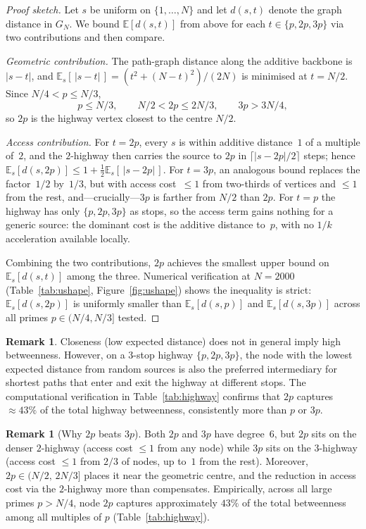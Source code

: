 \documentclass[11pt]{article}
\theoremstyle{plain}
\theoremstyle{definition}
\newtheorem{remark}[theorem]{Remark}
\newcommand{\EE}{\mathbb{E}}
\begin{document}
\begin{proof}[Proof sketch]
Let $s$ be uniform on $\{1,\ldots,N\}$ and let $d(s,t)$ denote the graph distance in $G_N$.
We bound $\EE[d(s,t)]$ from above for each $t \in \{p,2p,3p\}$ via two contributions
and then compare.

\emph{Geometric contribution.} The path-graph distance along the additive backbone is $|s-t|$,
and $\EE_s[\,|s-t|\,] = (t^2 + (N-t)^2)/(2N)$ is minimised at $t = N/2$. Since $N/4 < p \le N/3$,
\[
p \le N/3,\qquad N/2 < 2p \le 2N/3,\qquad 3p > 3N/4,
\]
so $2p$ is the highway vertex closest to the centre $N/2$.

\emph{Access contribution.} For $t = 2p$, every $s$ is within additive distance~$1$ of a multiple of~$2$,
and the $2$-highway then carries the source to $2p$ in $\lceil |s-2p|/2 \rceil$ steps; hence
$\EE_s[d(s,2p)] \le 1 + \tfrac{1}{2}\EE_s[\,|s-2p|\,]$.
For $t = 3p$, an analogous bound replaces the factor~$1/2$ by~$1/3$, but with access cost~$\le 1$ from
two-thirds of vertices and $\le 1$ from the rest, and---crucially---$3p$ is farther from $N/2$ than $2p$.
For $t = p$ the highway has only $\{p, 2p, 3p\}$ as stops, so the access term gains nothing for a generic source:
the dominant cost is the additive distance to~$p$, with no $1/k$ acceleration available locally.

Combining the two contributions, $2p$ achieves the smallest upper bound on
$\EE_s[d(s,t)]$ among the three. Numerical verification at $N = 2000$ (Table~\ref{tab:ushape},
Figure~\ref{fig:ushape}) shows the inequality is strict: $\EE_s[d(s, 2p)]$ is uniformly smaller
than $\EE_s[d(s, p)]$ and $\EE_s[d(s, 3p)]$ across all primes $p \in (N/4, N/3]$ tested.
\end{proof}

\begin{remark}
Closeness (low expected distance) does not in general imply high betweenness.
However, on a 3-stop highway $\{p, 2p, 3p\}$, the node with the lowest
expected distance from random sources is also the preferred intermediary
for shortest paths that enter and exit the highway at different stops.
The computational verification in Table~\ref{tab:highway} confirms that
$2p$ captures $\approx 43\%$ of the total highway betweenness,
consistently more than $p$ or $3p$.
\end{remark}

\begin{remark}[Why $2p$ beats $3p$]
Both $2p$ and $3p$ have degree~$6$, but $2p$ sits on the denser $2$-highway
(access cost $\le 1$ from any node) while $3p$ sits on the $3$-highway
(access cost $\le 1$ from $2/3$ of nodes, up to~$1$ from the rest).
Moreover, $2p \in (N/2,\, 2N/3]$ places it near the geometric centre, and the reduction in
access cost via the $2$-highway more than compensates.
Empirically, across all large primes $p > N/4$, node $2p$ captures
approximately $43\%$ of the total betweenness among all multiples of $p$
(Table~\ref{tab:highway}).
\end{remark}
\end{document}

